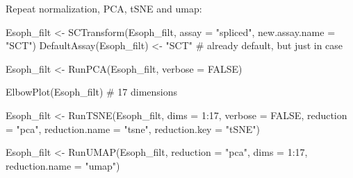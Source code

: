 \documentclass[
  letterpaper,
  DIV=11,
  numbers=noendperiod]{scrreprt}
\newenvironment{Shaded}{\begin{snugshade}}{\end{snugshade}}
\newcommand{\AttributeTok}[1]{\textcolor[rgb]{0.40,0.45,0.13}{#1}}
\newcommand{\CommentTok}[1]{\textcolor[rgb]{0.37,0.37,0.37}{#1}}
\newcommand{\ConstantTok}[1]{\textcolor[rgb]{0.56,0.35,0.01}{#1}}
\newcommand{\DecValTok}[1]{\textcolor[rgb]{0.68,0.00,0.00}{#1}}
\newcommand{\FunctionTok}[1]{\textcolor[rgb]{0.28,0.35,0.67}{#1}}
\newcommand{\NormalTok}[1]{\textcolor[rgb]{0.00,0.23,0.31}{#1}}
\newcommand{\OtherTok}[1]{\textcolor[rgb]{0.00,0.23,0.31}{#1}}
\newcommand{\SpecialCharTok}[1]{\textcolor[rgb]{0.37,0.37,0.37}{#1}}
\newcommand{\StringTok}[1]{\textcolor[rgb]{0.13,0.47,0.30}{#1}}
\begin{document}
Repeat normalization, PCA, tSNE and umap:

\begin{Shaded}
\begin{Highlighting}[]
\NormalTok{Esoph\_filt }\OtherTok{\textless{}{-}} \FunctionTok{SCTransform}\NormalTok{(Esoph\_filt, }\AttributeTok{assay =} \StringTok{"spliced"}\NormalTok{, }\AttributeTok{new.assay.name =} \StringTok{"SCT"}\NormalTok{)}
\FunctionTok{DefaultAssay}\NormalTok{(Esoph\_filt) }\OtherTok{\textless{}{-}} \StringTok{"SCT"} \CommentTok{\# already default, but just in case}

\NormalTok{Esoph\_filt }\OtherTok{\textless{}{-}} \FunctionTok{RunPCA}\NormalTok{(Esoph\_filt, }\AttributeTok{verbose =} \ConstantTok{FALSE}\NormalTok{)}

\FunctionTok{ElbowPlot}\NormalTok{(Esoph\_filt) }\CommentTok{\# 17 dimensions}

\NormalTok{Esoph\_filt }\OtherTok{\textless{}{-}} \FunctionTok{RunTSNE}\NormalTok{(Esoph\_filt, }\AttributeTok{dims =} \DecValTok{1}\SpecialCharTok{:}\DecValTok{17}\NormalTok{, }\AttributeTok{verbose =} \ConstantTok{FALSE}\NormalTok{, }\AttributeTok{reduction =} \StringTok{"pca"}\NormalTok{, }\AttributeTok{reduction.name =} \StringTok{"tsne"}\NormalTok{, }\AttributeTok{reduction.key =} \StringTok{"tSNE"}\NormalTok{)}

\NormalTok{Esoph\_filt }\OtherTok{\textless{}{-}} \FunctionTok{RunUMAP}\NormalTok{(Esoph\_filt, }\AttributeTok{reduction =} \StringTok{"pca"}\NormalTok{, }\AttributeTok{dims =} \DecValTok{1}\SpecialCharTok{:}\DecValTok{17}\NormalTok{, }\AttributeTok{reduction.name =} \StringTok{"umap"}\NormalTok{)}
\end{Highlighting}
\end{Shaded}
\end{document}
